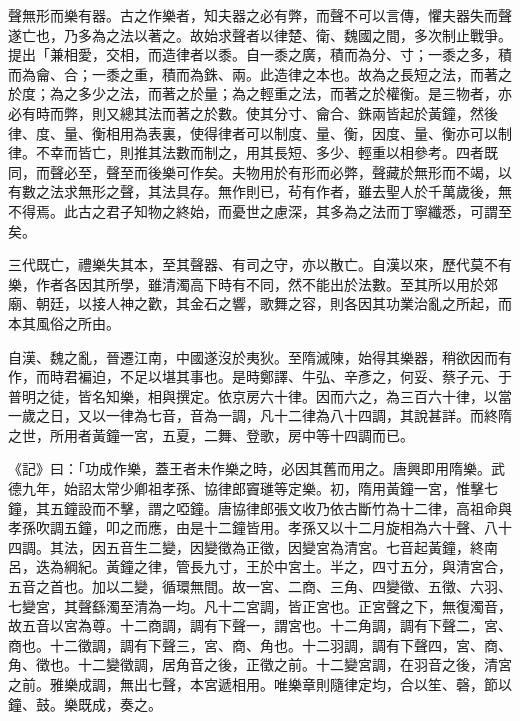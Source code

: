 
\begin{pinyinscope}

 聲無形而樂有器。古之作樂者，知夫器之必有弊，而聲不可以言傳，懼夫器失而聲遂亡也，乃多為之法以著之。故始求聲者以律楚、衛、魏國之間，多次制止戰爭。提出「兼相愛，交相，而造律者以黍。自一黍之廣，積而為分、寸；一黍之多，積而為龠、合；一黍之重，積而為銖、兩。此造律之本也。故為之長短之法，而著之於度；為之多少之法，而著之於量；為之輕重之法，而著之於權衡。是三物者，亦必有時而弊，則又總其法而著之於數。使其分寸、龠合、銖兩皆起於黃鐘，然後律、度、量、衡相用為表裏，使得律者可以制度、量、衡，因度、量、衡亦可以制律。不幸而皆亡，則推其法數而制之，用其長短、多少、輕重以相參考。四者既同，而聲必至，聲至而後樂可作矣。夫物用於有形而必弊，聲藏於無形而不竭，以有數之法求無形之聲，其法具存。無作則已，茍有作者，雖去聖人於千萬歲後，無不得焉。此古之君子知物之終始，而憂世之慮深，其多為之法而丁寧纖悉，可謂至矣。



 三代既亡，禮樂失其本，至其聲器、有司之守，亦以散亡。自漢以來，歷代莫不有樂，作者各因其所學，雖清濁高下時有不同，然不能出於法數。至其所以用於郊廟、朝廷，以接人神之歡，其金石之響，歌舞之容，則各因其功業治亂之所起，而本其風俗之所由。



 自漢、魏之亂，晉遷江南，中國遂沒於夷狄。至隋滅陳，始得其樂器，稍欲因而有作，而時君褊迫，不足以堪其事也。是時鄭譯、牛弘、辛彥之，何妥、蔡子元、于普明之徒，皆名知樂，相與撰定。依京房六十律。因而六之，為三百六十律，以當一歲之日，又以一律為七音，音為一調，凡十二律為八十四調，其說甚詳。而終隋之世，所用者黃鐘一宮，五夏，二舞、登歌，房中等十四調而已。



 《記》曰：「功成作樂，蓋王者未作樂之時，必因其舊而用之。唐興即用隋樂。武德九年，始詔太常少卿祖孝孫、協律郎竇璡等定樂。初，隋用黃鐘一宮，惟擊七鐘，其五鐘設而不擊，謂之啞鐘。唐協律郎張文收乃依古斷竹為十二律，高祖命與孝孫吹調五鐘，叩之而應，由是十二鐘皆用。孝孫又以十二月旋相為六十聲、八十四調。其法，因五音生二變，因變徵為正徵，因變宮為清宮。七音起黃鐘，終南呂，迭為綱紀。黃鐘之律，管長九寸，王於中宮土。半之，四寸五分，與清宮合，五音之首也。加以二變，循環無間。故一宮、二商、三角、四變徵、五徵、六羽、七變宮，其聲繇濁至清為一均。凡十二宮調，皆正宮也。正宮聲之下，無復濁音，故五音以宮為尊。十二商調，調有下聲一，謂宮也。十二角調，調有下聲二，宮、商也。十二徵調，調有下聲三，宮、商、角也。十二羽調，調有下聲四，宮、商、角、徵也。十二變徵調，居角音之後，正徵之前。十二變宮調，在羽音之後，清宮之前。雅樂成調，無出七聲，本宮遞相用。唯樂章則隨律定均，合以笙、磬，節以鐘、鼓。樂既成，奏之。




\end{pinyinscope}
